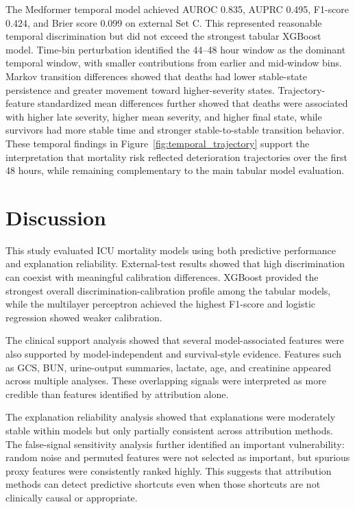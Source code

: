 \documentclass[10pt,twocolumn,letterpaper]{article}
\begin{document}
The Medformer temporal model achieved AUROC 0.835, AUPRC 0.495, F1-score 0.424, and Brier score 0.099 on external Set C. This represented reasonable temporal discrimination but did not exceed the strongest tabular XGBoost model. Time-bin perturbation identified the 44--48 hour window as the dominant temporal window, with smaller contributions from earlier and mid-window bins. Markov transition differences showed that deaths had lower stable-state persistence and greater movement toward higher-severity states. Trajectory-feature standardized mean differences further showed that deaths were associated with higher late severity, higher mean severity, and higher final state, while survivors had more stable time and stronger stable-to-stable transition behavior. These temporal findings in Figure~\ref{fig:temporal_trajectory} support the interpretation that mortality risk reflected deterioration trajectories over the first 48 hours, while remaining complementary to the main tabular model evaluation.

\section{Discussion}

This study evaluated ICU mortality models using both predictive performance and explanation reliability. External-test results showed that high discrimination can coexist with meaningful calibration differences. XGBoost provided the strongest overall discrimination-calibration profile among the tabular models, while the multilayer perceptron achieved the highest F1-score and logistic regression showed weaker calibration.

The clinical support analysis showed that several model-associated features were also supported by model-independent and survival-style evidence. Features such as GCS, BUN, urine-output summaries, lactate, age, and creatinine appeared across multiple analyses. These overlapping signals were interpreted as more credible than features identified by attribution alone.

The explanation reliability analysis showed that explanations were moderately stable within models but only partially consistent across attribution methods. The false-signal sensitivity analysis further identified an important vulnerability: random noise and permuted features were not selected as important, but spurious proxy features were consistently ranked highly. This suggests that attribution methods can detect predictive shortcuts even when those shortcuts are not clinically causal or appropriate.
\end{document}
